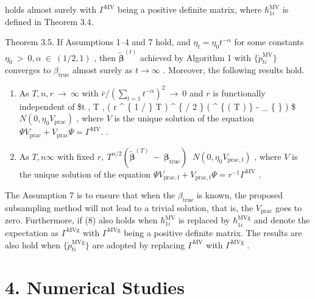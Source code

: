 \documentclass[
  10
]{article}
\begin{document}
holds almost surely with \(\Gamma ^ { \mathrm { M V } }\) being a
positive definite matrix, where
\(\hbar _ { 1 i } ^ { \mathrm { M V } }\) is defined in Theorem 3.4.

Theorem 3.5. If Assumptions 1--4 and 7 hold, and
\(\eta _ { t } = \eta _ { 0 } t ^ { - \alpha }\) for some constants
\(\eta _ { 0 } ~ > ~ 0 , \alpha ~ \in ~ ( 1 / 2 , 1 )\) , then
\(\tilde { \boldsymbol { \beta } } ^ { ( t ) }\) achieved by Algorithm 1
with \(\{ \grave { p } _ { t i } ^ { \mathrm { M V } } \}\) converges to
\(\beta _ { \mathrm { { t r u e } } }\) almost surely as
\(t \to \infty\) . Moreover, the following results hold.

\begin{enumerate}
\def\labelenumi{\roman{enumi}.}
\item
  As \(T , n , r \ \to \ \infty\) with
  \(\bar { r } / ( \sum _ { t = 1 } t ^ { - \alpha } ) ^ { 2 } \ \to \ 0\)
  and \(r\) is functionally independent of \$t , T , ( r \^{} \{ 1 / \}
  T ) \^{} \{ / 2 \} ( \^{} \{ ( T ) \} - \_ \{ \} ) \$
  \(N ( 0 , \eta _ { 0 } V _ { \mathrm { p r a c } } )\) , where \(V\)
  is the unique solution of the equation
  \(\Psi V _ { \mathrm { p r a c } } + V _ { \mathrm { p r a c } } \Psi = \Gamma ^ { \mathrm { M V } } .\)
  .
\item
  As \(T , n  \infty\) with fixed
  \(r , \ T ^ { \alpha / 2 } ( \tilde { \pmb { \beta } } ^ { ( T ) } \ - \ \pmb { \beta } _ { \mathrm { t r u e } } ) \ \)
  \(N ( 0 , \eta _ { 0 } V _ { \mathrm { p r a c , f } } )\) , where
  \(V\) is the unique solution of the equation
  \(\Psi V _ { \mathrm { p r a c , f } } + V _ { \mathrm { p r a c , f } } \Psi = r ^ { - 1 } \Gamma ^ { \mathrm { M V } }\)
  .
\end{enumerate}

The Assumption 7 is to ensure that when the
\(\beta _ { \mathrm { t r u e } }\) is known, the proposed subsampling
method will not lead to a trivial solution, that is, the
\(V _ { \mathrm { p r a c } }\) goes to zero. Furthermore, if (8) also
holds when \(\hbar _ { 1 i } ^ { \mathrm { M V } }\) is replaced by
\(\hbar _ { 1 i } ^ { \mathrm { M V g } }\) and denote the expectation
as \(\Gamma ^ { \mathrm { M V g } }\) with
\(\Gamma ^ { \mathrm { M V g } }\) being a positive definite matrix. The
results are also hold when
\(\{ \grave { p } _ { t i } ^ { \mathrm { M V g } } \}\) are adopted by
replacing \(\Gamma ^ { \mathrm { M V } }\) with
\(\Gamma ^ { \mathrm { M V g } }\) .

\section{4. Numerical Studies}\label{numerical-studies}
\end{document}
